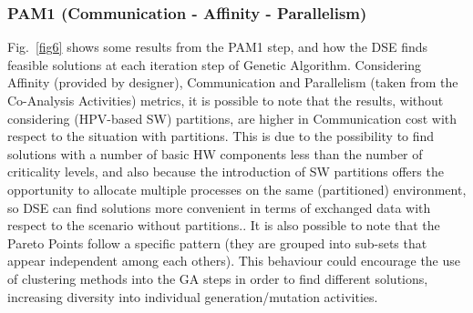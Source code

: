 \subsubsection{PAM1 (Communication - Affinity - Parallelism)}
%
Fig.~\ref{fig6} shows some results from the PAM1 step, and how the DSE finds feasible solutions at each iteration step of Genetic Algorithm. Considering Affinity (provided by designer), Communication and Parallelism (taken from the Co-Analysis Activities) metrics, it is possible to note that the results, without considering (HPV-based SW) partitions, are higher in Communication cost with respect to the situation with partitions. This is due to the possibility to find solutions with a number of basic HW components less than the number of criticality levels, and also because the introduction of SW partitions offers the opportunity to allocate multiple processes on the same (partitioned) environment, so DSE can find solutions more convenient in terms of exchanged data with respect to the scenario without partitions.. It is also possible to note that the Pareto Points follow a specific pattern (they are grouped into sub-sets that appear independent among each others). This behaviour could encourage the use of clustering methods into the GA steps in order to find different solutions, increasing diversity into individual generation/mutation activities. \par
%
\begin{figure*}[htbp]
	\centering
	\label{6a_init}
	\label{6b_init} \\
	\label{6c_init} 
	\label{6d_init} \\
	\label{6e_init}
	\label{6f_init}
	\caption{Pareto Set results from the Design Space Exploration activities with respect to Affinity, Communication and Parallelism metrics. The different Pareto Points positions and dispersion patterns depend on SBM application, on the number of processes/BBs/channels/criticality levels and on the specific iteration, weights values and reference inputs considered in the whole design flow.}
	\label{fig6} 
\end{figure*}
